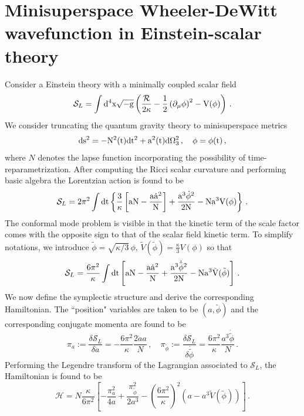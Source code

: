 \documentclass[a4paper,11pt]{article}
\begin{document}
\section{Minisuperspace Wheeler-DeWitt wavefunction in Einstein-scalar theory}\label{app:WDW}
Consider a Einstein theory with a minimally coupled scalar field
\begin{equation}
    \mathcal{S}_L = \int \rm{d}^4 x \sqrt{-g} \left(\frac{\mathcal{R}}{2\kappa}-\frac{1}{2}\left(\partial_\mu\phi\right)^2 -V(\phi)\right)\,.
\end{equation}
We consider truncating the quantum gravity theory to minisuperspace metrics
\begin{equation}
    \rm{d}s^2 = -N^2(t)\rm{d}t^2 + a^2(t)\rm{d}\Omega_3^2\,,\quad \phi =\phi(t)\,,
\end{equation}
where $N$ denotes the lapse function incorporating the possibility of time-reparametrization. After computing the Ricci scalar curvature and performing basic algebra the Lorentzian action is found to be
\begin{equation}
    \mathcal{S}_L = 2\pi^2 \int \rm{d}t \left\{\frac{3}{\kappa}\left[aN -\frac{a \dot{a}^2}{N} \right]+\frac{a^3 \dot{\phi}^2}{2N}-Na^3 V(\phi)\right\}\,.
\end{equation}
The conformal mode problem is visible in that the kinetic term of the scale factor comes with the opposite sign to that of the scalar field kinetic term. To simplify notations, we introduce $\tilde{\phi}=\sqrt{\kappa/3} \,\phi,\,\tilde{V}(\tilde{\phi}) = \frac{\kappa}{3}V(\phi)$ so that
\begin{equation}
    \mathcal{S}_L = \frac{6\pi^2}{\kappa}\int \rm{d}t \left[aN -\frac{a \dot{a}^2}{N} +\frac{a^3 \dot{\tilde{\phi}}^2}{2N}-Na^3 \tilde{V}(\tilde{\phi})\right]\,.
\end{equation}
We now define the symplectic structure and derive the corresponding Hamiltonian. The ``position" variables are taken to be $(a,\tilde{\phi})$ and the corresponding conjugate momenta are found to be
\begin{equation}
    \pi_a :=\frac{\delta \mathcal{S}_L}{\delta \dot{a}}= -\frac{6\pi^2}{\kappa}\frac{2\dot{a}a}{N}\,, \quad \pi_{\tilde{\phi}}:=\frac{\delta \mathcal{S}_L}{\delta \dot{\tilde{\phi}}} = \frac{6\pi^2}{\kappa}\frac{a^3\dot{\tilde{\phi}}}{N}\,.
\end{equation}
Performing the Legendre transform of the Lagrangian associated to $\mathcal{S}_L$, the Hamiltonian is found to be
\begin{equation}
    \mathcal{H} = N\frac{\kappa}{6\pi^2}\left[-\frac{\pi_a^2}{4a}+\frac{\pi_{\tilde{\phi}}^2}{2a^3} - \left(\frac{6\pi^2}{\kappa}\right)^2 \left(a-a^3\tilde{V}(\tilde{\phi})\right)\right]\,.
\end{equation}
\end{document}
